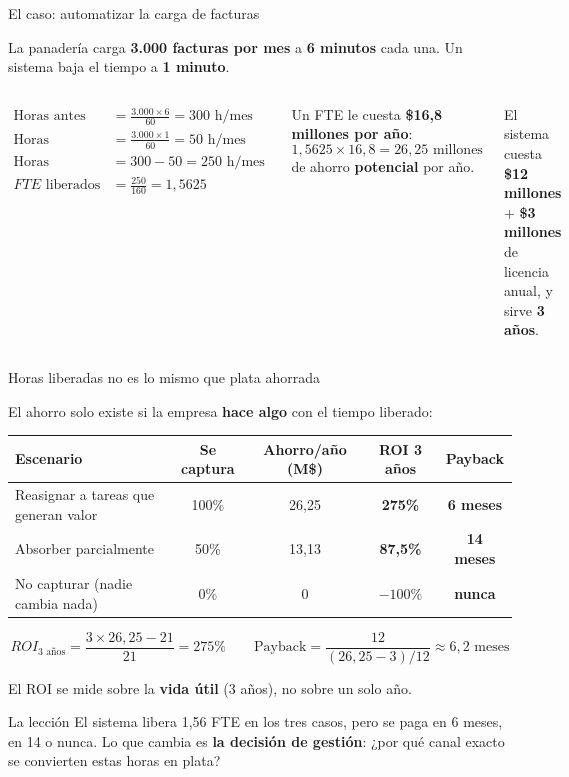 \documentclass[aspectratio=169,10pt]{beamer}
\begin{document}
\begin{frame}{El caso: automatizar la carga de facturas}

La panadería carga \textbf{3.000 facturas por mes} a \textbf{6 minutos} cada una. Un sistema baja el
tiempo a \textbf{1 minuto}.

\begin{columns}[T]
\[
\begin{aligned}
\text{Horas antes}     &= \frac{3.000 \times 6}{60} = 300 \text{ h/mes} \\[2pt]
\text{Horas después}   &= \frac{3.000 \times 1}{60} = 50 \text{ h/mes} \\[2pt]
\text{Horas liberadas} &= 300 - 50 = 250 \text{ h/mes} \\[2pt]
FTE \text{ liberados}  &= \frac{250}{160} = 1{,}5625
\end{aligned}
\]

Un FTE le cuesta \textbf{\$16,8 millones por año}:
\[
1{,}5625 \times 16{,}8 = 26{,}25 \text{ millones}
\]
de ahorro \textbf{potencial} por año.

\vspace{0.2cm}
El sistema cuesta \textbf{\$12 millones} + \textbf{\$3 millones} de licencia anual, y sirve \textbf{3 años}.
\end{columns}
\end{frame}

\begin{frame}{Horas liberadas no es lo mismo que plata ahorrada}

El ahorro solo existe si la empresa \textbf{hace algo} con el tiempo liberado:

\begin{center}
\small
\begin{tabular}{lcccc}
\toprule
\textbf{Escenario} & \textbf{Se captura} & \textbf{Ahorro/año (M\$)} & \textbf{ROI 3 años} & \textbf{Payback} \\
\midrule
Reasignar a tareas que generan valor & 100\% & 26,25 & \textbf{275\%}  & \textbf{6 meses} \\
Absorber parcialmente                & 50\%  & 13,13 & \textbf{87,5\%} & \textbf{14 meses} \\
No capturar (nadie cambia nada)      & 0\%   & 0     & \textbf{$-100\%$} & \textbf{nunca} \\
\bottomrule
\end{tabular}
\end{center}

\[
ROI_{3\text{ años}} = \frac{3 \times 26{,}25 - 21}{21} = 275\%
\qquad
\text{Payback} = \frac{12}{(26{,}25 - 3)/12} \approx 6{,}2 \text{ meses}
\]

\vspace{-0.2cm}
\small El ROI se mide sobre la \textbf{vida útil} (3 años), no sobre un solo año.

\begin{alertblock}{La lección}
El sistema libera 1,56 FTE en los tres casos, pero se paga en 6 meses, en 14 o nunca.
Lo que cambia es \textbf{la decisión de gestión}:
¿por qué canal exacto se convierten estas horas en plata?
\end{alertblock}
\end{frame}
\end{document}
